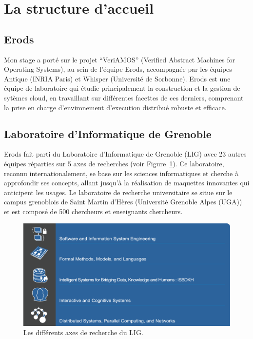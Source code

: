 \section{La structure d'accueil}
\label{structure}

\subsection{Erods}

Mon stage a porté sur le projet ``VeriAMOS'' (Verified Abstract Machines for 
Operating Systems), au sein de l'équipe Erods, accompagnée par les équipes 
Antique (INRIA Paris) et Whisper (Université de Sorbonne). Erods est une équipe 
de laboratoire qui étudie principalement la construction et la gestion de 
sytèmes cloud, en travaillant sur différentes facettes de ces derniers, 
comprenant la prise en charge d'environement d'execution distribué robuste et 
efficace. 

\subsection{Laboratoire d'Informatique de Grenoble}

Erods fait parti du Laboratoire d'Informatique de Grenoble (LIG) avec 23 autres 
équipes réparties sur 5 axes de recherches (voir Figure~\ref{fig:lig}). Ce 
laboratoire, reconnu internationalement, se base sur les sciences informatiques 
et cherche à approfondir ses concepts, allant jusqu'à la réalisation de 
maquettes innovantes qui anticipent les usages. Le laboratoire de recherche 
universitaire se situe sur le campus grenoblois de Saint Martin d'Hères 
(Université Grenoble Alpes (UGA)) et est composé de 500 chercheurs et 
enseignants chercheurs.

\begin{figure}[h!t] \centering
    \includegraphics[width=12.5cm]{images/axeslig}
    \caption{Les différents axes de recherche du LIG.}
    \label{fig:lig}
\end{figure}

